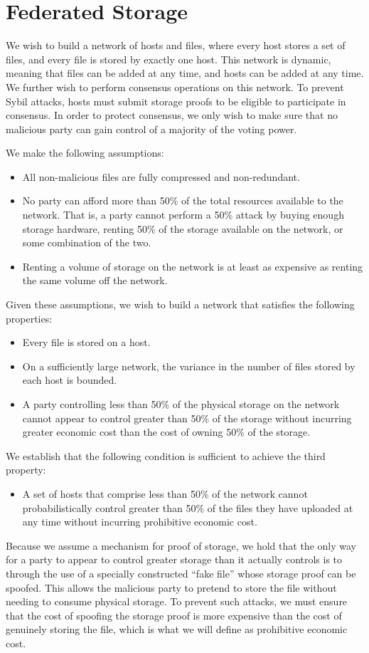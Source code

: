 \documentclass[twocolumn]{article}
\begin{document}
\section{Federated Storage}
We wish to build a network of hosts and files, where every host stores a set of files, and every file is stored by exactly one host.
This network is dynamic, meaning that files can be added at any time, and hosts can be added at any time.
We further wish to perform consensus operations on this network.
To prevent Sybil attacks, hosts must submit storage proofs to be eligible to participate in consensus.
In order to protect consensus, we only wish to make sure that no malicious party can gain control of a majority of the voting power.

We make the following assumptions:
\begin{itemize}
	\item All non-malicious files are fully compressed and non-redundant.
	\item No party can afford more than 50\% of the total resources available to the network. That is, a party cannot perform a 50\% attack by buying enough storage hardware, renting 50\% of the storage available on the network, or some combination of the two.
	\item Renting a volume of storage on the network is at least as expensive as renting the same volume off the network.
\end{itemize}

Given these assumptions, we wish to build a network that satisfies the following properties:
\begin{itemize}
	\item Every file is stored on a host.
	\item On a sufficiently large network, the variance in the number of files stored by each host is bounded.
	\item A party controlling less than 50\% of the physical storage on the network cannot appear to control greater than 50\% of the storage without incurring greater economic cost than the cost of owning 50\% of the storage.
\end{itemize}

We establish that the following condition is sufficient to achieve the third property:
\begin{itemize}
	\item A set of hosts that comprise less than 50\% of the network cannot probabilistically control greater than 50\% of the files they have uploaded at any time without incurring prohibitive economic cost.
\end{itemize}
Because we assume a mechanism for proof of storage, we hold that the only way for a party to appear to control greater storage than it actually controls is to through the use of a specially constructed ``fake file'' whose storage proof can be spoofed.
This allows the malicious party to pretend to store the file without needing to consume physical storage.
To prevent such attacks, we must ensure that the cost of spoofing the storage proof is more expensive than the cost of genuinely storing the file, which is what we will define as prohibitive economic cost.
\end{document}
